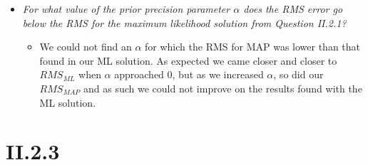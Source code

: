 \documentclass[12pt, a4paper]{article}
\begin{document}
\begin{itemize}
\item \textit{For what value of the prior precision parameter $\alpha$ does the RMS error go below the RMS for the maximum likelihood solution from Question II.2.1?}

	\begin{itemize}
		\item We could not find an $\alpha$ for which the RMS for MAP was lower than that found in our ML solution. As expected we came closer and closer to $RMS_{ML}$ when $\alpha$ approached 0, but as we increased $\alpha$, so did our $RMS_{MAP}$ and as such we could not improve on the results found with the ML solution.
	\end{itemize}
\end{itemize}

\section{II.2.3}
\end{document}
